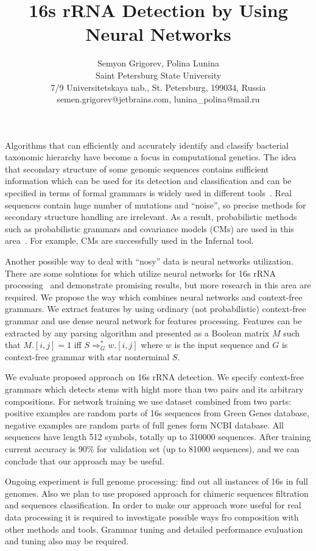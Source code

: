\documentclass[12pt]{article}  %
\title{16s rRNA Detection by Using Neural Networks}
\author{Semyon Grigorev, Polina Lunina
\\
       {Saint Petersburg State University}\\
       {7/9 Universitetskaya nab., St. Petersburg, 199034, Russia}\\
       semen.grigorev@jetbrains.com, lunina\_polina@mail.ru
       }
\date{}
\theoremstyle{definition}
\theoremstyle{remark}
\begin{document}
\maketitle
Algorithms that can efficiently and accurately identify and classify bacterial taxonomic hierarchy have become a focus in computational genetics.
The idea that secondary structure of some genomic sequences contains sufficient information which can be used for its 
detection and classification and can be specified in terms of formal grammars is widely used in different tools~\cite{GrammarsRNA, PCFG, meta, LWPCFG}.
Real sequences contain huge number of mutations and ``noise'', so precise methods for secondary structure handling are irrelevant.
As a result, probabilistic methods such as probabilistic grammars and covariance models (CMs) are used in this area~\cite{EddyDurbin}.
For example, CMs are successfully used in the Infernal tool.%

Another possible way to deal with ``nosy'' data is neural networks utilization. 
There are some solutions for which utilize neural networks for 16s rRNA processing~\cite{Humidor, ANN} and demonstrate promising results, but more research in this area are required.
We propose the way which combines neural networks and context-free grammars. 
We extract features by using ordinary (not probabilistic) context-free grammar and use dense neural network for features processing.
Features can be extracted by any parsing algorithm and presented as a Boolean matrix $M$ such that $M.[i,j]=1$ iff $S \Rightarrow^*_G w.[i,j]$ where $w$ is the input sequence and $G$ is context-free grammar with star nonterminal $S$.

We evaluate proposed approach on 16s rRNA detection.
We specify context-free grammars which detects stems with hight more than two pairs and its arbitrary compositions.
For network training we use dataset combined from two parts: positive examples are random parts of 16s sequences from Green Genes database, negative examples are random parts of full genes form NCBI database.%
All sequences have length 512 symbols, totally up to 310000 sequences.
After training current accuracy is 90\% for validation set (up to 81000 sequences), and we can conclude that our approach may be useful.

Ongoing experiment is full genome processing: find out all instances of 16s in full genomes.
Also we plan to use proposed approach for chimeric sequences filtration and sequences classification.
In order to make our approach wore useful for real data processing it is required to investigate possible ways fro composition with other methods and tools.
Grammar tuning and detailed performance evaluation and tuning also may be required.
\end{document}
